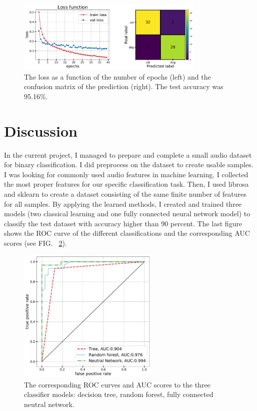 \documentclass[12pt a4paper]{article}
\numberwithin{equation}{section}
\begin{document}
\begin{figure}[H]
\centering
\includegraphics[width=0.8\textwidth]{fig/conf2.pdf}
\caption{The loss as a function of the number of epochs (left) and the confusion matrix of the prediction (right). The test accuracy was 95.16\%.}
\label{fig11}
\end{figure}

\section{Discussion}

In the current project, I managed to prepare and complete a small audio dataset for binary classification. I did preprocess on the dataset to create usable samples. I was looking for commonly used audio features in machine learning. I collected the most proper features for our specific classification task. Then, I used librosa and sklearn to create a dataset consisting of the same finite number of features for all samples.  By applying the learned methods, I created and trained three models (two classical learning and one fully connected neural network model) to classify the test dataset with accuracy higher than 90 percent. The last figure shows the ROC curve of the different classifications and the corresponding AUC scores (see FIG. ~\ref{fig12}).

\begin{figure}[H]
\centering
\includegraphics[width=0.6\textwidth]{fig/ROC.pdf}
\caption{The corresponding ROC curves and AUC scores to the three classifier models: decision tree, random forest, fully connected neutral network.}
\label{fig12}
\end{figure}
\end{document}

